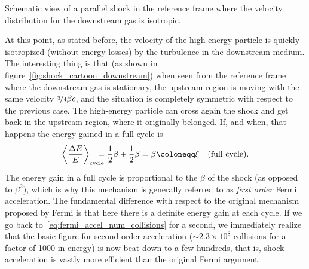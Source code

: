 \begin{marginfigure}
  
  \caption{Schematic view of a parallel shock in the reference frame where the
  velocity distribution for the downstream gas is isotropic.}
  \label{fig:shock_cartoon_downstream}
\end{marginfigure}

At this point, as stated before, the velocity of the high-energy particle is quickly
isotropized (without energy losses) by the turbulence in the downstream medium.
The interesting thing is that (as shown in figure~\ref{fig:shock_cartoon_downstream})
when seen from the reference frame where the downstream gas is stationary, the
upstream region is moving with the same velocity $\nicefrac{3}{4} \beta c$, and the
situation is completely symmetric with respect to the previous case.
The high-energy particle can cross again the shock and get back in the upstream
region, where it originally belonged. If, and when, that happens the energy gained
in a full cycle is
\begin{align}
  \ave{\frac{\Delta E}{E}}_\text{cycle} \!\!\!\!\!\! =
  \frac{1}{2} \beta + \frac{1}{2} \beta =
  \beta \coloneqq \xi \quad\text{(full cycle)}.
\end{align}
The energy gain in a full cycle is proportional to the $\beta$ of the shock
(as opposed to $\beta^2$), which is why this mechanism is generally referred to as
\emph{first order} Fermi acceleration. The fundamental difference with respect to
the original mechanism proposed by Fermi is that here there is a definite energy
gain at each cycle. If we go back to~\eqref{eq:fermi_accel_num_collisions} for a
second, we immediately realize that the basic figure for second order acceleration
($\sim 2.3 \times 10^8$ collisions for a factor of 1000 in energy) is now beat down
to a few hundreds, that is, shock acceleration is vastly more efficient than the
original Fermi argument.

